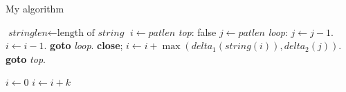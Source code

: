 \newpage
\begin{algorithm}
\caption{My algorithm}\label{euclid}
\begin{algorithmic}[1]
\State $\textit{stringlen} \gets \text{length of }\textit{string}$
\State $i \gets \textit{patlen}$
\BState \emph{top}:
 \Return false
\EndIf
\State $j \gets \textit{patlen}$
\BState \emph{loop}:
\State $j \gets j-1$.
\State $i \gets i-1$.
\State \textbf{goto} \emph{loop}.
\State \textbf{close};
\EndIf
\State $i \gets i+\max(\textit{delta}_1(\textit{string}(i)),\textit{delta}_2(j))$.
\State \textbf{goto} \emph{top}.
\EndProcedure
\end{algorithmic}
\end{algorithm}

\begin{algorithmic}
    \State $i\gets 0$
\Else
        \State $i\gets i+k$
    \EndIf
\EndIf
\end{algorithmic}